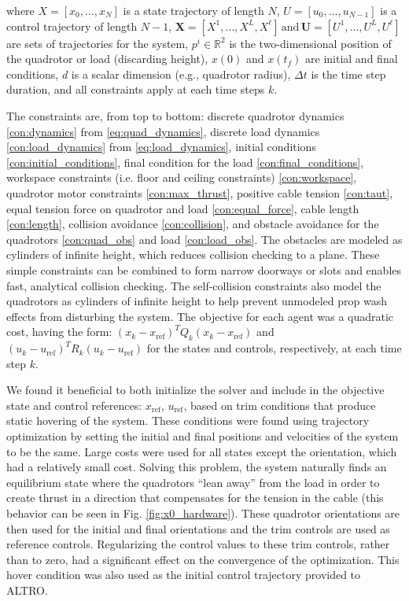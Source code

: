 \documentclass[../root.tex]{subfiles}
\begin{document}
where $X = [x_0,\dots,x_N]$ is a state trajectory of length $N$, $U =
[u_0,\dots,u_{N-1}]$ is a control trajectory of length $N-1$, $\mathbf{X} =
[X^1,\dots,X^L,X^{\ell}]\, \text{and}\, \mathbf{U} =
[U^1,\dots,U^L,U^{\ell}]$ are sets of trajectories for the system, $p^i \in
\mathbb{R}^2$ is the two-dimensional position of the quadrotor or load
(discarding height), $x(0)$ and $x(t_f)$ are initial and final
conditions, $d$ is a scalar dimension (e.g., quadrotor radius), $\Delta t$
is the time step duration, and all constraints apply at each time steps $k$.

The constraints are, from top to bottom: discrete quadrotor dynamics
\eqref{con:dynamics} from \eqref{eq:quad_dynamics}, discrete load dynamics
\eqref{con:load_dynamics} from \eqref{eq:load_dynamics}, initial conditions
\eqref{con:initial_conditions}, final condition for the load
\eqref{con:final_conditions}, workspace constraints (i.e. floor and ceiling
constraints) \eqref{con:workspace}, quadrotor motor constraints
\eqref{con:max_thrust}, positive cable tension \eqref{con:taut}, equal
tension force on quadrotor and load \eqref{con:equal_force}, cable length
\eqref{con:length}, collision avoidance \eqref{con:collision}, and obstacle
avoidance for the quadrotors \eqref{con:quad_obs} and load
\eqref{con:load_obs}. The obstacles are modeled as cylinders of
infinite height, which reduces collision checking to a plane. These simple
constraints can be combined to form narrow doorways or slots and enables
fast, analytical collision checking. The self-collision constraints
also model the quadrotors as cylinders of infinite height to
help prevent unmodeled prop wash effects from disturbing the system. The
objective for each agent was a quadratic cost, having the form: $(x_k -
x_{\text{ref}})^T Q_k (x_k - x_{\text{ref}})$ and $(u_k - u_{\text{ref}})^T
R_k (u_k - u_{\text{ref}})$ for the states and controls, respectively, at
each time step $k$.

We found it beneficial to both initialize the solver and include in the
objective state and control references: $x_{\text{ref}}$, $u_{\text{ref}}$,
based on trim conditions that produce static hovering of the system. These
conditions were found using trajectory optimization by setting the initial
and final positions and velocities of the system to be the same. Large costs
were used for all states except the orientation, which had a relatively small
cost. Solving this problem, the system naturally finds an equilibrium state
where the quadrotors ``lean away'' from the load in order to create thrust in
a direction that compensates for the tension in the cable (this behavior can
be seen in Fig. \ref{fig:x0_hardware}). These quadrotor orientations are then
used for the initial and final orientations and the trim controls are used as
reference controls. Regularizing the control values to these trim controls,
rather than to zero, had a significant effect on the convergence of the
optimization. This hover condition was also used as the initial control
trajectory provided to ALTRO.
\end{document}
